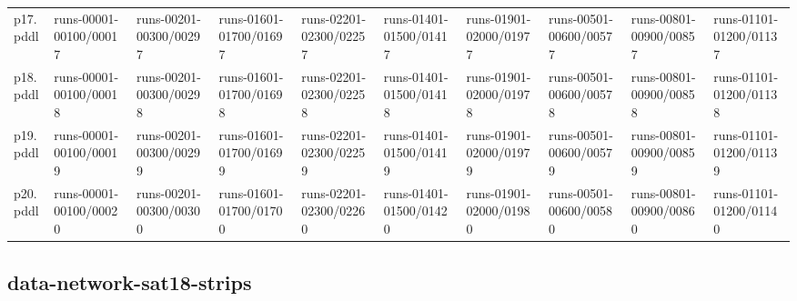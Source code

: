 \documentclass{article}
\begin{document}
\begin{tabular}{@{}lrrrrrrrrr@{}}
p17.pddl & \multicolumn{1}{|l|}{runs-00001-00100/00017} & \multicolumn{1}{|l|}{runs-00201-00300/00297} & \multicolumn{1}{|l|}{runs-01601-01700/01697} & \multicolumn{1}{|l|}{runs-02201-02300/02257} & \multicolumn{1}{|l|}{runs-01401-01500/01417} & \multicolumn{1}{|l|}{runs-01901-02000/01977} & \multicolumn{1}{|l|}{runs-00501-00600/00577} & \multicolumn{1}{|l|}{runs-00801-00900/00857} & \multicolumn{1}{|l|}{runs-01101-01200/01137} \\
p18.pddl & \multicolumn{1}{|l|}{runs-00001-00100/00018} & \multicolumn{1}{|l|}{runs-00201-00300/00298} & \multicolumn{1}{|l|}{runs-01601-01700/01698} & \multicolumn{1}{|l|}{runs-02201-02300/02258} & \multicolumn{1}{|l|}{runs-01401-01500/01418} & \multicolumn{1}{|l|}{runs-01901-02000/01978} & \multicolumn{1}{|l|}{runs-00501-00600/00578} & \multicolumn{1}{|l|}{runs-00801-00900/00858} & \multicolumn{1}{|l|}{runs-01101-01200/01138} \\
p19.pddl & \multicolumn{1}{|l|}{runs-00001-00100/00019} & \multicolumn{1}{|l|}{runs-00201-00300/00299} & \multicolumn{1}{|l|}{runs-01601-01700/01699} & \multicolumn{1}{|l|}{runs-02201-02300/02259} & \multicolumn{1}{|l|}{runs-01401-01500/01419} & \multicolumn{1}{|l|}{runs-01901-02000/01979} & \multicolumn{1}{|l|}{runs-00501-00600/00579} & \multicolumn{1}{|l|}{runs-00801-00900/00859} & \multicolumn{1}{|l|}{runs-01101-01200/01139} \\
p20.pddl & \multicolumn{1}{|l|}{runs-00001-00100/00020} & \multicolumn{1}{|l|}{runs-00201-00300/00300} & \multicolumn{1}{|l|}{runs-01601-01700/01700} & \multicolumn{1}{|l|}{runs-02201-02300/02260} & \multicolumn{1}{|l|}{runs-01401-01500/01420} & \multicolumn{1}{|l|}{runs-01901-02000/01980} & \multicolumn{1}{|l|}{runs-00501-00600/00580} & \multicolumn{1}{|l|}{runs-00801-00900/00860} & \multicolumn{1}{|l|}{runs-01101-01200/01140} \\
\end{tabular}

\hypertarget{run_dir-data-network-sat18-strips}{}
\subsection*{data-network-sat18-strips}
\end{document}

